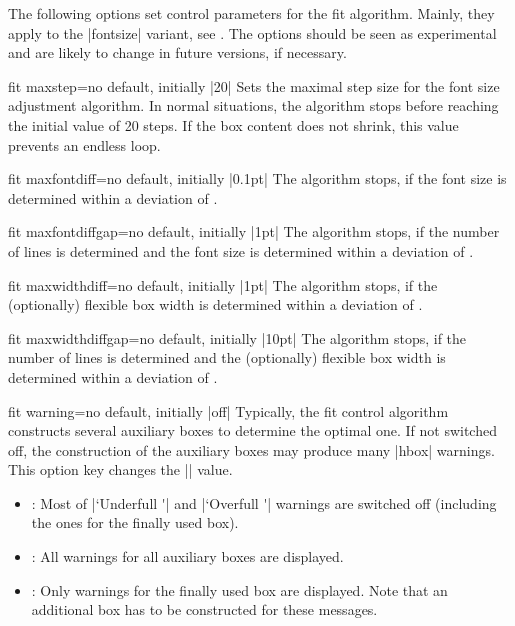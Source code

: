 \clearpage
\begin{marker}
The following options set control parameters for the fit algorithm.
Mainly, they apply to the |fontsize| variant, see .
The options should be seen as experimental and are likely to change in future versions,
if necessary.
\end{marker}

\begin{docTcbKey}{fit maxstep}{=}{no default, initially |20|}
  Sets the maximal step size for the font size adjustment algorithm.
  In normal situations, the algorithm stops before reaching the initial value of 20 steps.
  If the box content does not shrink, this value prevents an endless loop.
\end{docTcbKey}


\begin{docTcbKey}{fit maxfontdiff}{=}{no default, initially |0.1pt|}
  The algorithm stops, if the font size is determined within a deviation of
  .
\end{docTcbKey}


\begin{docTcbKey}{fit maxfontdiffgap}{=}{no default, initially |1pt|}
  The algorithm stops, if the number of lines is determined and the font size is
  determined within a deviation of .
\end{docTcbKey}


\begin{docTcbKey}{fit maxwidthdiff}{=}{no default, initially |1pt|}
  The algorithm stops, if the (optionally) flexible box width
  is determined within a deviation of .
\end{docTcbKey}


\begin{docTcbKey}{fit maxwidthdiffgap}{=}{no default, initially |10pt|}
  The algorithm stops, if the number of lines is determined and the (optionally) flexible box width
  is determined within a deviation of .
\end{docTcbKey}


\begin{docTcbKey}{fit warning}{=}{no default, initially |off|}
  Typically, the fit control algorithm constructs several auxiliary boxes
  to determine the optimal one. If not switched off, the construction of
  the auxiliary boxes may produce many |hbox| warnings. This option key
  changes the |\hbadness| value.
  \begin{itemize}
  \item{}: Most of |`Underfull \hbox'| and |`Overfull \hbox'| warnings are
    switched off (including the ones for the finally used box).
  \item{}: All warnings for all auxiliary boxes are displayed.
  \item{}: Only warnings for the finally used box are displayed.
    Note that an additional box has to be constructed for these messages.
  \end{itemize}
\end{docTcbKey}

